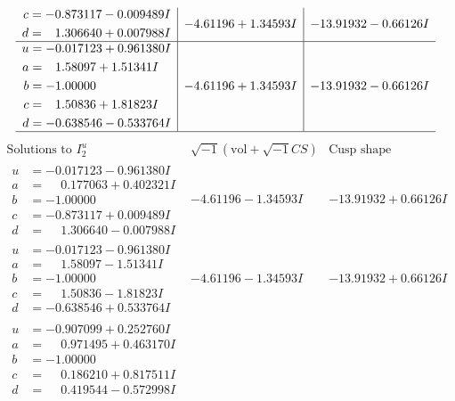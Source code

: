 \documentclass[1p]{elsarticle_modified}
\theoremstyle{definition}
\newcommand{\I}{\sqrt{-1}}
\begin{document}
$$\begin{array}{c|c|c}
\begin{aligned}
c &= -0.873117 - 0.009489 I \\
d &= \phantom{-}1.306640 + 0.007988 I\end{aligned}
 & -4.61196 + 1.34593 I & -13.91932 - 0.66126 I \\ \hline\begin{aligned}
u &= -0.017123 + 0.961380 I \\
a &= \phantom{-}1.58097 + 1.51341 I \\
b &= -1.00000\phantom{ +0.000000I} \\
c &= \phantom{-}1.50836 + 1.81823 I \\
d &= -0.638546 - 0.533764 I\end{aligned}
 & -4.61196 + 1.34593 I & -13.91932 - 0.66126 I\\
 \hline 
 \end{array}$$\newpage$$\begin{array}{c|c|c}  
\text{Solutions to }I^u_{2}& \I (\text{vol} + \sqrt{-1}CS) & \text{Cusp shape}\\
 \hline 
\begin{aligned}
u &= -0.017123 - 0.961380 I \\
a &= \phantom{-}0.177063 + 0.402321 I \\
b &= -1.00000\phantom{ +0.000000I} \\
c &= -0.873117 + 0.009489 I \\
d &= \phantom{-}1.306640 - 0.007988 I\end{aligned}
 & -4.61196 - 1.34593 I & -13.91932 + 0.66126 I \\ \hline\begin{aligned}
u &= -0.017123 - 0.961380 I \\
a &= \phantom{-}1.58097 - 1.51341 I \\
b &= -1.00000\phantom{ +0.000000I} \\
c &= \phantom{-}1.50836 - 1.81823 I \\
d &= -0.638546 + 0.533764 I\end{aligned}
 & -4.61196 - 1.34593 I & -13.91932 + 0.66126 I \\ \hline\begin{aligned}
u &= -0.907099 + 0.252760 I \\
a &= \phantom{-}0.971495 + 0.463170 I \\
b &= -1.00000\phantom{ +0.000000I} \\
c &= \phantom{-}0.186210 + 0.817511 I \\
d &= \phantom{-}0.419544 - 0.572998 I\end{aligned}

\end{array}$$
\end{document}

